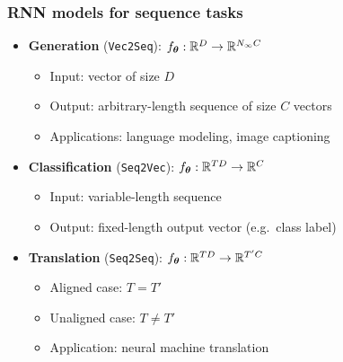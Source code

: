 \documentclass[smaller]{beamer}
\begin{document}
\begin{frame}
\begin{figure}[h!]
{}
    \end{figure}
  \end{frame}



  

  \begin{frame}
    \frametitle{RNN models for sequence tasks}
    \pe

    \begin{itemize}
    \item \textbf{Generation} (\texttt{Vec2Seq}): $f_{\bm{\theta}} : \mathbb R^{D}\to \mathbb R^{N_{\infty}C}$\pe
      \begin{itemize}
      \item Input: vector of size $D$\pe
      \item Output: arbitrary-length sequence of size $C$ vectors\pe
      \item Applications: language modeling, image captioning
      \end{itemize}
    \item \textbf{Classification} (\texttt{Seq2Vec}): $f_{\bm{\theta}}: \mathbb R^{TD} \to \mathbb R^{C}$ \pe
      \begin{itemize}
      \item Input: variable-length sequence\pe       
      \item Output: fixed-length output vector (e.g.\ class label)\pe
      \end{itemize}
    \item \textbf{Translation} (\texttt{Seq2Seq}):  $f_{\bm{\theta}}: \mathbb R^{TD} \to \mathbb R^{T'C}$ \pe
      \begin{itemize}
      \item Aligned case: $T=T'$\pe
      \item Unaligned case: $T\ne T'$\pe
      \item Application: neural machine translation
      \end{itemize}
    \end{itemize}
  \end{frame}
  
\end{document}
